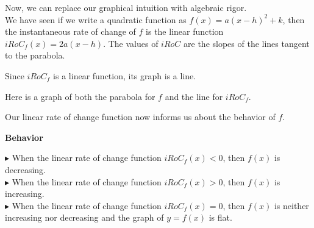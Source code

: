 \documentclass{ximera}
\begin{document}
Now, we can replace our graphical intuition with algebraic rigor. \\ 

We have seen if we write a quadratic function as $f(x) = a (x - h)^2 + k$, then the instantaneous rate of change of $f$ is the linear function $iRoC_f(x) = 2 a (x - h)$. The values of $iRoC$ are the slopes of the lines tangent to the parabola.


Since $iRoC_f$ is a linear function, its graph is a line.


Here is a graph of both the parabola for $f$ and the line for $iRoC_f$.







\begin{image}
\end{image}
Our linear rate of change function now informs us about the behavior of $f$. \\



\begin{conclusion}  \textbf{\textcolor{green!50!black}{Behavior}}

$\blacktriangleright$ When the linear rate of change function $iRoC_f(x) < 0$, then $f(x)$ is decreasing. \\

$\blacktriangleright$ When the linear rate of change function $iRoC_f(x) > 0$, then $f(x)$ is increasing. \\

$\blacktriangleright$ When the linear rate of change function $iRoC_f(x) = 0$, then $f(x)$ is neither increasing nor decreasing and the graph of $y = f(x)$ is flat. 

\end{conclusion}
\end{document}
